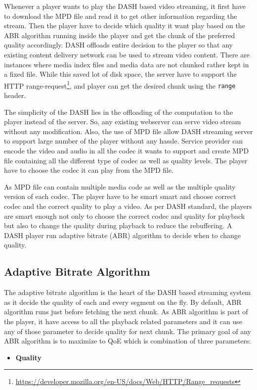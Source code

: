 Whenever a player wants to play the DASH based video streaming, it first have to download the MPD file and read it to get other information regarding the stream. Then the player have to decide which quality it want play based on the ABR algorithm running inside the player and get the chunk of the preferred quality accordingly. DASH offloads entire decision to the player so that any existing content delivery network can be used to stream video content. There are instances where media index files and media data are not chunked rather kept in a fixed file. While this saved lot of disk space, the server have to support the HTTP range-request\footnote{\url{https://developer.mozilla.org/en-US/docs/Web/HTTP/Range_requests}}, and player can get the desired chunk using the {\tt range} header.

The simplicity of the DASH lies in the offloading of the computation to the player instead of the server. So, any existing webserver can serve video stream without any modification. Also, the use of MPD file allow DASH streaming server to support large number of the player without any hassle. Service provider can encode the video and audio in all the codec it wants to support and create MPD file containing all the different type of codec as well as quality levels. The player have to choose the codec it can play from the MPD file.

As MPD file can contain multiple media code as well as the multiple quality version of each codec. The player have to be smart smart and choose correct codec and the correct quality to play a video. As per DASH standard, the players are smart enough not only to choose the correct codec and quality for playback but also to change the quality during playback to reduce the rebuffering. A DASH player run adaptive bitrate (ABR) algorithm to decide when to change quality.

\subsection{Adaptive Bitrate Algorithm}
The adaptive bitrate algorithm is the heart of the DASH based streaming system as it decide the quality of each and every segment on the fly. By default, ABR algorithm runs just before fetching the next chunk. As ABR algorithm is part of the player, it have access to all the playback related parameters and it can use any of those parameter to decide quality for next chunk. The primary goal of any ABR algorithm is to maximize to QoE which is combination of three parameters:
\begin{itemize}
	\item {\bf Quality}
\end{itemize}

